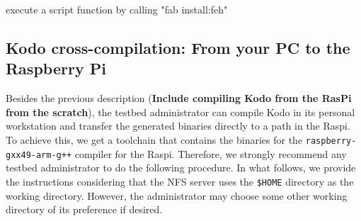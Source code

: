 execute a script function by calling "fab install:feh"

\subsection{Kodo cross-compilation: From your PC to the Raspberry Pi}

Besides the previous description (\textbf{Include compiling Kodo from the
RasPi from the scratch}), the testbed administrator can compile Kodo in its
personal workstation and transfer the generated binaries directly to
a path in the \ac{Raspi}. To achieve this, we get a toolchain that
contains the binaries for the \texttt{raspberry-gxx49-arm-g++} compiler
for the \ac{Raspi}. Therefore, we strongly recommend any testbed
administrator to do the following procedure. In what follows, we provide
the instructions considering that the NFS server uses the \texttt{\$HOME}
directory as the working directory. However, the administrator may choose
some other working directory of its preference if desired.

